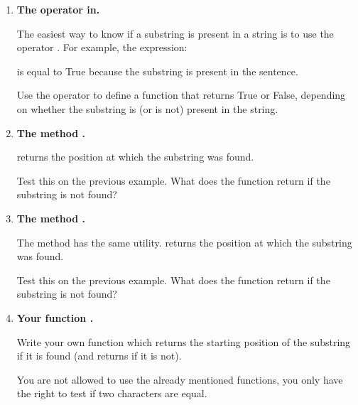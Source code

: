 \documentclass[11pt,class=report,crop=false]{standalone}
\begin{document}





\begin{activite}[Find]


\begin{enumerate}
  \item \textbf{The operator \og{}in\fg{}.}
  
  
  The easiest way to know if a substring is present in a string is to use the operator \og{}\fg{}. For example, the expression: 
  
  is equal to \og{}True\fg{} because the substring  is present in the sentence.
  
  Use the  operator to define a  function that returns \og{}True\fg{} or \og{}False\fg{}, depending on whether the substring is (or is not) present in the string.
  
  \item \textbf{The method .}
  
  
    returns the position at which the substring was found. 
  
  Test this on the previous example. What does the function return if the substring is not found?
 
   \item \textbf{The method .}
  
  
  The  method has the same utility.  returns the position at which the substring was found. 

  Test this on the previous example. What does the function return if the substring is not found?
 
  
  \item \textbf{Your function .}
  
  Write your own  function which returns the starting position of the substring if it is found (and returns  if it is not).
  
  You are not allowed to use the already mentioned \Python{} functions, you only have the right to test if two characters are equal. 
  
\end{enumerate}   
     
\end{activite}
\end{document}
